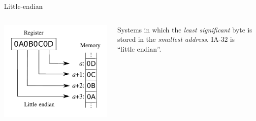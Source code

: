 \documentclass[]{beamer}
\begin{document}
\begin{frame}
\begin{block}{Little-endian}
\begin{columns}
\begin{column}{0.25\columnwidth}
      \includegraphics[width=\textwidth]{images/Little-Endian.pdf}
      \label{Little-Endian (right)}

    \end{column}
    \begin{column}{0.6\columnwidth}
      Systems in
      which the \emph{least significant} byte is stored in the
      \emph{smallest address}. \alert{IA-32 is ``little endian''}.

    \end{column}

  \end{columns}
  \end{block}
\end{frame}

\end{document}
